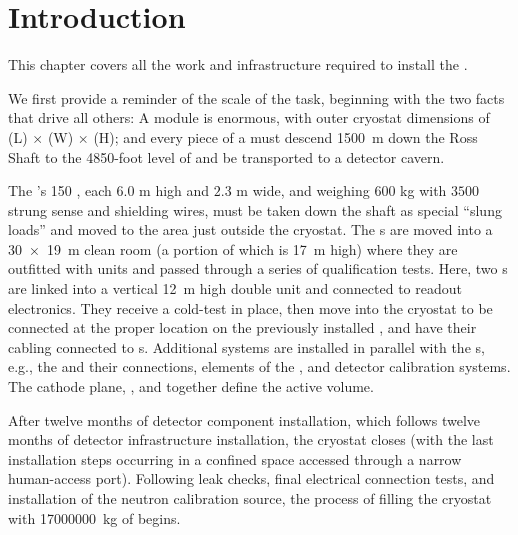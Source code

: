 
\section{Introduction}
\label{ch:sp-install-intro}

This chapter covers all the work and infrastructure required to install the . 
 
We first provide a reminder of the scale of the task, beginning with the two facts that drive all others: A   module is enormous, with outer cryostat dimensions  of 
\cryostatlen{}(L) $\times$ \cryostatwdth{}(W) $\times$ \cryostatht{}(H); 
and every piece of a  must descend 
\SI{1500}{m} down the Ross Shaft to the 4850-foot level of  and be transported to a detector cavern.


The 's 150 , each $6.0$ m high and $2.3$ m wide, and  weighing $600$ kg with $3500$ strung sense and shielding wires, must be taken down the shaft as special ``slung loads'' and moved to the area just outside the  cryostat. 
The s are moved into a \SI{30x19}{\meter} clean room (a portion of which is \SI{17}{m} high) where they are outfitted  with  units and passed through a series of qualification tests.
Here, two s are linked into a vertical \SI{12}{m} high double unit and connected to readout electronics. 
They receive a cold-test in place, then move into the cryostat to be connected at the proper location on the previously installed , and have their cabling connected to \fdth{}s. 
Additional systems are installed in parallel with the s, e.g., the  and their  connections, elements of the , and detector calibration systems. The cathode plane, , and  together define the  active volume. 

After twelve months of detector component installation, which follows twelve months of detector infrastructure installation, the cryostat closes (with the last installation steps occurring in a confined space accessed through a narrow human-access port). 
Following leak checks, final electrical connection tests, and installation of the neutron calibration source, the process of filling the cryostat with \SI{17000000}{\kilo\gram} of  begins.

